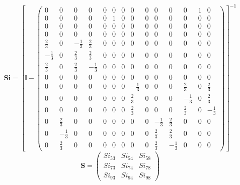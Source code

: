 \[ \mathbf{Si} = \left[ \mathbb{I}  - \left(\begin{array}{cccccccccccccc} 0 & 0 & 0 & 0 & 0 & 0 & 0 & 0 & 0 & 0 & 0 & 0 & 1 & 0 \\ 0 & 0 & 0 & 0 & 0 & 1 & 0 & 0 & 0 & 0 & 0 & 0 & 0 & 0 \\ 0 & 0 & 0 & 0 & 0 & 0 & 0 & 0 & 0 & 0 & 0 & 0 & 0 & 0 \\ 0 & 0 & 0 & 0 & 0 & 0 & 0 & 0 & 0 & 0 & 0 & 0 & 0 & 0 \\ \frac{2}{3} & 0 & -\frac{1}{3} & \frac{2}{3} & 0 & 0 & 0 & 0 & 0 & 0 & 0 & 0 & 0 & 0 \\ -\frac{1}{3} & 0 & \frac{2}{3} & \frac{2}{3} & 0 & 0 & 0 & 0 & 0 & 0 & 0 & 0 & 0 & 0 \\ \frac{2}{3} & 0 & \frac{2}{3} & -\frac{1}{3} & 0 & 0 & 0 & 0 & 0 & 0 & 0 & 0 & 0 & 0 \\ 0 & 0 & 0 & 0 & 0 & 0 & 0 & 0 & 0 & 0 & 0 & 0 & 0 & 0 \\ 0 & 0 & 0 & 0 & 0 & 0 & 0 & -\frac{1}{3} & 0 & 0 & 0 & \frac{2}{3} & 0 & \frac{2}{3} \\ 0 & 0 & 0 & 0 & 0 & 0 & 0 & \frac{2}{3} & 0 & 0 & 0 & -\frac{1}{3} & 0 & \frac{2}{3} \\ 0 & 0 & 0 & 0 & 0 & 0 & 0 & \frac{2}{3} & 0 & 0 & 0 & \frac{2}{3} & 0 & -\frac{1}{3} \\ 0 & \frac{2}{3} & 0 & 0 & 0 & 0 & 0 & 0 & 0 & -\frac{1}{3} & \frac{2}{3} & 0 & 0 & 0 \\ 0 & -\frac{1}{3} & 0 & 0 & 0 & 0 & 0 & 0 & 0 & \frac{2}{3} & \frac{2}{3} & 0 & 0 & 0 \\ 0 & \frac{2}{3} & 0 & 0 & 0 & 0 & 0 & 0 & 0 & \frac{2}{3} & -\frac{1}{3} & 0 & 0 & 0 \end{array}\right) \right]^{-1} \]
\[ \mathbf{S} = \left(\begin{array}{ccc} Si_{53} & Si_{54} & Si_{58} \\ Si_{73} & Si_{74} & Si_{78} \\ Si_{93} & Si_{94} & Si_{98} \end{array}\right) \]
